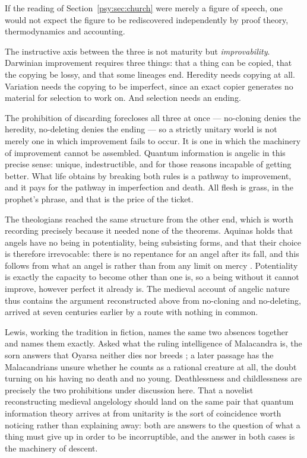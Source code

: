 If the reading of Section~\ref{psy:sec:church} were merely a figure
of speech, one would not expect the figure to be rediscovered
independently by proof theory, thermodynamics and accounting.

The instructive axis between the three is not maturity but
\emph{improvability}.
Darwinian improvement requires three things: that a thing can be
copied, that the copying be lossy, and that some lineages end.
Heredity needs copying at all.
Variation needs the copying to be imperfect, since an exact copier
generates no material for selection to work on.
And selection needs an ending.

\begin{remark}
\label{psy:rem:angelic}
The prohibition of discarding forecloses all three at once ---
no-cloning denies the heredity, no-deleting denies the ending --- so
a strictly unitary world is not merely one in which improvement
fails to occur.
It is one in which the machinery of improvement cannot be assembled.
Quantum information is angelic in this precise sense: unique,
indestructible, and for those reasons incapable of getting better.
What life obtains by breaking both rules is a pathway to
improvement, and it pays for the pathway in imperfection and death.
All flesh is grass, in the prophet's phrase, and that is the price
of the ticket.
\end{remark}

The theologians reached the same structure from the other end, which
is worth recording precisely because it needed none of the theorems.
Aquinas holds that angels have no being in potentiality, being
subsisting forms, and that their choice is therefore irrevocable:
there is no repentance for an angel after its fall, and this follows
from what an angel is rather than from any limit on mercy
\cite{aquinas}.
Potentiality is exactly the capacity to become other than one is, so
a being without it cannot improve, however perfect it already is.
The medieval account of angelic nature thus contains the argument
reconstructed above from no-cloning and no-deleting, arrived at
seven centuries earlier by a route with nothing in common.

Lewis, working the tradition in fiction, names the same two absences
together and names them exactly.
Asked what the ruling intelligence of Malacandra is, the sorn
answers that Oyarsa neither dies nor breeds \cite{lewis1938}; a
later passage has the Malacandrians unsure whether he counts as a
rational creature at all, the doubt turning on his having no death
and no young.
Deathlessness and childlessness are precisely the two prohibitions
under discussion here.
That a novelist reconstructing medieval angelology should land on
the same pair that quantum information theory arrives at from
unitarity is the sort of coincidence worth noticing rather than
explaining away: both are answers to the question of what a thing
must give up in order to be incorruptible, and the answer in both
cases is the machinery of descent.

